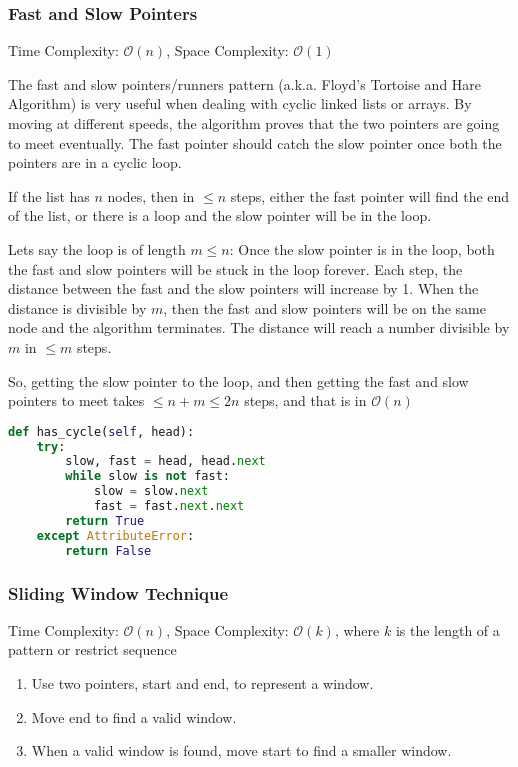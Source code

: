\documentclass{article}
\newcommand{\bigO}{\ensuremath{\mathcal{O}}}
\begin{document}
    \subsubsection{Fast and Slow Pointers}
    Time Complexity: $\bigO(n)$, Space Complexity: $\bigO(1)$
    
    The fast and slow pointers/runners pattern (a.k.a. Floyd’s Tortoise and Hare Algorithm) is very useful when dealing with cyclic linked lists or arrays. By moving at different speeds, the algorithm proves that the two pointers are going to meet eventually. The fast pointer should catch the slow pointer once both the pointers are in a cyclic loop.
     
    If the list has $n$ nodes, then in $\leq n$ steps, either the fast pointer will find the end of the list, or there is a loop and the slow pointer will be in the loop.
    
    Lets say the loop is of length $m \leq n$: Once the slow pointer is in the loop, both the fast and slow pointers will be stuck in the loop forever. Each step, the distance between the fast and the slow pointers will increase by 1. When the distance is divisible by $m$, then the fast and slow pointers will be on the same node and the algorithm terminates. The distance will reach a number divisible by $m$ in $\leq m$ steps.

    So, getting the slow pointer to the loop, and then getting the fast and slow pointers to meet takes $\leq n + m \leq 2n$ steps, and that is in $\bigO(n)$

\begin{lstlisting}[language=Python]
def has_cycle(self, head):
    try:
        slow, fast = head, head.next
        while slow is not fast:
            slow = slow.next
            fast = fast.next.next
        return True
    except AttributeError:
        return False
\end{lstlisting}

    \subsubsection{Sliding Window Technique}
    Time Complexity: $\bigO(n)$, Space Complexity: $\bigO(k)$, where $k$ is the length of a pattern or restrict sequence 
    
    \begin{enumerate}
        \item Use two pointers, start and end, to represent a window.
        \item Move end to find a valid window.
        \item When a valid window is found, move start to find a smaller window.
    \end{enumerate}
    
\end{document}
